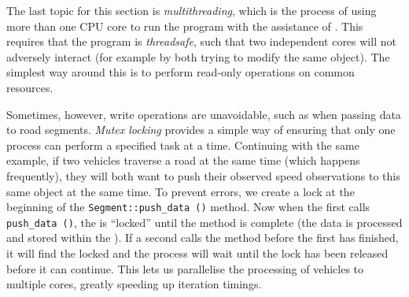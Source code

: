 The last topic for this section is \emph{multithreading}, which is the process of using more than one CPU core to run the program with the assistance of  \citep{OMP}. This requires that the program is \emph{threadsafe}, such that two independent cores will not adversely interact (for example by both trying to modify the same object). The simplest way around this is to perform read-only operations on common resources.

Sometimes, however, write operations are unavoidable, such as when passing data to road segments. \emph{Mutex locking} provides a simple way of ensuring that only one process can perform a specified task at a time. Continuing with the same example, if two vehicles traverse a road at the same time (which happens frequently), they will both want to push their observed speed observations to this same  object at the same time. To prevent errors, we create a lock at the beginning of the \verb+Segment::push_data ()+ method. Now when the first  calls \verb+push_data ()+, the  is ``locked'' until the method is complete (the data is processed and stored within the ). If a second  calls the method before the first has finished, it will find the  locked and the process will wait until the lock has been released before it can continue. This lets us parallelise the processing of vehicles to multiple cores, greatly speeding up iteration timings.
